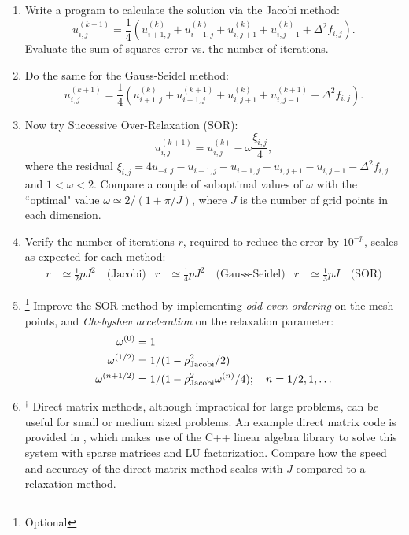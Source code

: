 \documentclass[11pt]{article}
\begin{document}
\begin{enumerate}
\item Write a program to calculate the solution via the Jacobi method:
\begin{equation}
u_{i,j}^{(k+1)} = 	\frac{1}{4}\left( u_{i+1,j}^{(k)} + u_{i-1,j}^{(k)} + u_{i,j+1}^{(k)} + u_{i,j-1}^{(k)} + \Delta^2 f_{i,j}\right).
\end{equation}
Evaluate the sum-of-squares error vs. the number of iterations. 
\item Do the same for the Gauss-Seidel method:
\begin{equation}
u_{i,j}^{(k+1)}  = \frac{1}{4}\left( u_{i+1,j}^{(k)} + u_{i-1,j}^{(k+1)} + u_{i,j+1}^{(k)} + u_{i,j-1}^{(k+1)} + \Delta^2 f_{i,j}\right).
\end{equation}
\item Now try Successive Over-Relaxation (SOR):
\begin{equation}
u_{i,j}^{(k+1)}  = u_{i,j}^{(k)} -\omega \frac{\xi_{i,j}}{4},
\end{equation}
where the residual $\xi_{i,j} =  4 u_{-i,j} - u_{i+1,j} - u_{i-1,j} - u_{i,j+1} - u_{i,j-1}  - \Delta^2 f_{i,j}$ and $1 < \omega < 2$. Compare a couple of  suboptimal values of $\omega$ with the ``optimal" value  $\omega \simeq 2 / ( 1 + \pi /J)$, where $J$ is the number of grid points in each dimension.
\item Verify the number of iterations $r$, required to reduce the error by $10^{-p}$, scales as expected for each method:
\begin{align}
r & \simeq \tfrac{1}{2} p J^2 \quad \textrm{(Jacobi)} & r & \simeq \tfrac{1}{4} p J^2 \quad \textrm{(Gauss-Seidel)} &  r & \simeq \tfrac{1}{3} p J \quad \textrm{(SOR)}
\end{align}  
\item\footnote[2]{Optional}  Improve the SOR method by implementing \emph{odd-even ordering} on the mesh-points, and \emph{Chebyshev acceleration} on the relaxation parameter:
\begin{align}
\omega^{(0)} &= 1 \nonumber \\
\omega^{(1/2)} &= 1/(1- \rho_{\rm{Jacobi}}^2/2)  \\
\omega^{(n+ 1/2)} &= 1/(1- \rho_{\rm{Jacobi}}^2 \omega^{(n)}/4); \quad n = 1/2,1,\dots   \nonumber
\end{align}
\item $^\dagger$ Direct matrix methods, although impractical for large problems, can be useful for small or medium sized problems. An example direct matrix code is provided in , which makes use of the C++ linear algebra library  to solve this system with sparse matrices and LU factorization.  Compare how the speed and accuracy of the direct matrix method scales with $J$ compared to a relaxation method. 
\end{enumerate}
\end{document}
